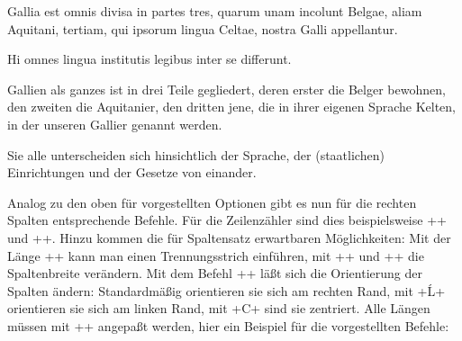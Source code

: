 \begin{lfgwprint}{}
\begin{pairs}
\begin{Leftside}
\beginnumbering
\autopar
{}

Gallia est omnis divisa in partes tres, 
    quarum unam incolunt Belgae,
    aliam Aquitani,
    tertiam, qui ipsorum lingua Celtae, nostra Galli appellantur.

Hi omnes lingua institutis legibus inter se differunt.

\endnumbering
\end{Leftside}

\begin{Rightside}
\beginnumbering
\autopar

Gallien als ganzes ist in drei Teile gegliedert,
    deren erster die Belger bewohnen,
    den zweiten die Aquitanier,
    den dritten jene, die in ihrer eigenen Sprache Kelten, in der unseren Gallier genannt werden.

Sie alle unterscheiden sich hinsichtlich der Sprache, 
    der (staatlichen) Einrichtungen und der Gesetze von einander.
    
\endnumbering
\end{Rightside}
\end{pairs}

\Columns
\end{lfgwprint}

Analog zu den oben für \reledmac vorgestellten Optionen gibt es nun für die rechten Spalten entsprechende Befehle.
Für die Zeilenzähler sind dies beispielsweise ++ und ++.
Hinzu kommen die für Spaltensatz erwartbaren Möglichkeiten:
Mit der Länge +\columnrulewidth+ kann man einen Trennungsstrich einführen, mit +\Lcolwidth+ und +\Rcolwidth+ die Spaltenbreite verändern.
Mit dem Befehl ++ läßt sich die Orientierung der Spalten ändern: Standardmäßig orientieren sie sich am rechten Rand, mit +Ĺ+ orientieren sie sich am linken Rand, mit +C+ sind sie zentriert.
Alle Längen müssen mit +\setlength{<name>}{<laenge>}+ angepaßt werden, hier ein Beispiel für die vorgestellten Befehle: 

\begin{lfgwcode}{}
\setlength{\columnrulewidth}{0.5pt}
\setlength{\Lcolwidth}{0.425\textwidth}
\setlength{\Rcolwidth}{0.425\textwidth}
\end{lfgwcode}

